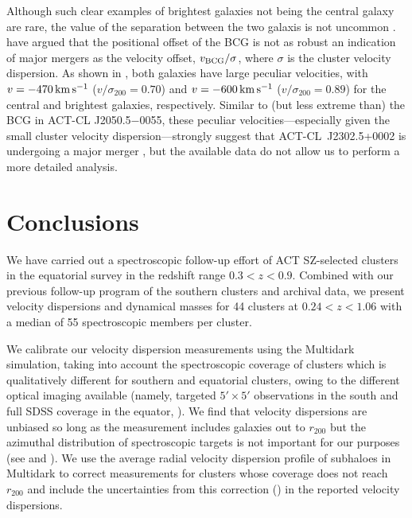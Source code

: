 Although such clear examples of brightest galaxies not being the central galaxy are rare, the value of the separation between the two galaxis is not uncommon \citep{skibba11,martel14}. \cite{martel14} have argued that the positional offset of the BCG is not as robust an indication of major mergers as the velocity offset, $v_{\rm BCG}/\sigma$, where $\sigma$ is the cluster velocity dispersion. As shown in , both galaxies have large peculiar velocities, with $v=-470\,\mathrm{km\,s^{-1}}$ ($v/\sigma_{200}=0.70$) and $v=-600\,\mathrm{km\,s^{-1}}$ ($v/\sigma_{200}=0.89$) for the central and brightest galaxies, respectively. Similar to (but less extreme than) the BCG in ACT-CL J2050.5$-$0055, these peculiar velocities---especially given the small cluster velocity dispersion---strongly suggest that ACT-CL~J2302.5+0002 is undergoing a major merger \citep{martel14}, but the available data do not allow us to perform a more detailed analysis.

\section{Conclusions}\label{s:conclusions}

We have carried out a spectroscopic follow-up effort of ACT SZ-selected clusters in the equatorial 
survey in the redshift range $0.3<z<0.9$. Combined with our previous follow-up program of the 
southern clusters and archival data, we present velocity dispersions and dynamical masses for 44 
clusters at $0.24<z<1.06$ with a median of 55 spectroscopic members per cluster.

We calibrate our velocity dispersion measurements using the Multidark simulation, taking into 
account the spectroscopic coverage of clusters which is qualitatively different for southern and 
equatorial clusters, owing to the different optical imaging available (namely, targeted 
$5'\times5'$ observations in the south and full SDSS coverage in the equator, 
). We find that velocity dispersions are unbiased so long as the measurement 
includes galaxies out to $r_{200}$ but the azimuthal distribution of spectroscopic targets is not 
important for our purposes (see  and ). We use the average radial 
velocity dispersion profile of subhaloes in Multidark to correct measurements for clusters whose 
coverage does not reach $r_{200}$ and include the uncertainties from this correction 
() in the reported velocity dispersions.


